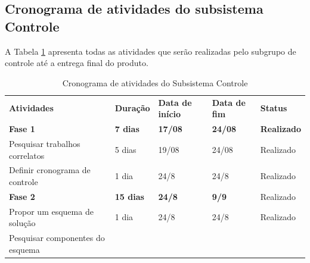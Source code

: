 \newpage

\subsection{Cronograma de atividades do subsistema Controle}

A Tabela \ref{tab:cronograma_controle} apresenta todas as atividades que serão realizadas pelo subgrupo de controle até a entrega final do produto.

\begin{table}[!htbp]
 \centering
 \caption{Cronograma de atividades do Subsistema Controle} \label{tab:cronograma_controle}
 {\renewcommand\arraystretch{1.25}
 \begin{tabular}{ l l l l l }
  \cline{1-1}\cline{2-2}\cline{3-3}\cline{4-4}\cline{5-5}  
    \multicolumn{1}{|p{6.900cm}|}{\textbf{Atividades}} &
    \multicolumn{1}{p{1.817cm}|}{\textbf{Duração}} &
    \multicolumn{1}{p{1.650cm}|}{\textbf{Data de início}} &
    \multicolumn{1}{p{1.550cm}|}{\textbf{Data de fim}} &
    \multicolumn{1}{p{2.000cm}|}{\textbf{Status}}
  \\  
  \cline{1-1}\cline{2-2}\cline{3-3}\cline{4-4}\cline{5-5}  
    \multicolumn{1}{|p{6.900cm}|}{\textbf{Fase 1}} &
    \multicolumn{1}{p{1.817cm}|}{\textbf{7 dias}} &
    \multicolumn{1}{p{1.650cm}|}{\textbf{17/08}} &
    \multicolumn{1}{p{1.550cm}|}{\textbf{24/08}} &
    \multicolumn{1}{p{2.000cm}|}{\textbf{Realizado}}
  \\  
  \cline{1-1}\cline{2-2}\cline{3-3}\cline{4-4}\cline{5-5}  
    \multicolumn{1}{|p{6.900cm}|}{Pesquisar trabalhos correlatos} &
    \multicolumn{1}{p{1.817cm}|}{5 dias} &
    \multicolumn{1}{p{1.650cm}|}{19/08} &
    \multicolumn{1}{p{1.550cm}|}{24/08} &
    \multicolumn{1}{p{2.000cm}|}{Realizado}
  \\  
  \cline{1-1}\cline{2-2}\cline{3-3}\cline{4-4}\cline{5-5}  
    \multicolumn{1}{|p{6.900cm}|}{Definir cronograma de controle} &
    \multicolumn{1}{p{1.817cm}|}{1 dia} &
    \multicolumn{1}{p{1.650cm}|}{24/8} &
    \multicolumn{1}{p{1.550cm}|}{24/8} &
    \multicolumn{1}{p{2.000cm}|}{Realizado}
  \\  
  \cline{1-1}\cline{2-2}\cline{3-3}\cline{4-4}\cline{5-5}  
    \multicolumn{1}{|p{6.900cm}|}{\textbf{Fase 2}} &
    \multicolumn{1}{p{1.817cm}|}{\textbf{15 dias}} &
    \multicolumn{1}{p{1.650cm}|}{\textbf{24/8}} &
    \multicolumn{1}{p{1.550cm}|}{\textbf{9/9}} &
    \multicolumn{1}{p{2.000cm}|}{Realizado}
  \\  
  \cline{1-1}\cline{2-2}\cline{3-3}\cline{4-4}\cline{5-5}  
    \multicolumn{1}{|p{6.900cm}|}{Propor um esquema de solução} &
    \multicolumn{1}{p{1.817cm}|}{1 dia} &
    \multicolumn{1}{p{1.650cm}|}{24/8} &
    \multicolumn{1}{p{1.550cm}|}{24/8} &
    \multicolumn{1}{p{2.000cm}|}{Realizado}
  \\  
  \cline{1-1}\cline{2-2}\cline{3-3}\cline{4-4}\cline{5-5}  
    \multicolumn{1}{|p{6.900cm}|}{Pesquisar componentes do esquema  			

}
\end{tabular}}
\end{table}
